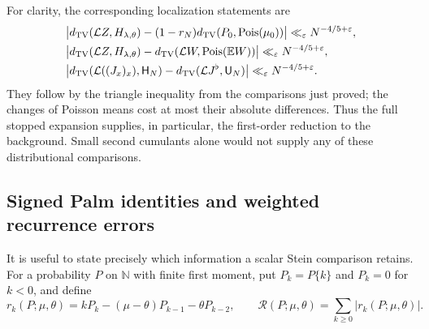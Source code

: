 For clarity, the corresponding localization statements are
\begin{align}
 &\big|d_{\mathrm{TV}}(\mathcal L Z,H_{\lambda,\theta})
       -(1-r_N)d_{\mathrm{TV}}(P_0,\operatorname{Pois}(\mu_0))\big|
       \ll_\varepsilon N^{-4/5+\varepsilon},
       \label{p1:limits:background-localization}\\
 &\big|d_{\mathrm{TV}}(\mathcal L Z,H_{\lambda,\theta})
       -d_{\mathrm{TV}}(\mathcal L W,\operatorname{Pois}(\mathbb E W))\big|
       \ll_\varepsilon N^{-4/5+\varepsilon},
       \label{p1:limits:erased-localization}\\
 &\big|d_{\mathrm{TV}}(\mathcal L((J_x)_x),\mathsf H_N)
       -d_{\mathrm{TV}}(\mathcal L J^\flat,\mathsf U_N)\big|
       \ll_\varepsilon N^{-4/5+\varepsilon}.
       \label{p1:limits:spatial-localization}
\end{align}
They follow by the triangle inequality from the comparisons just
proved; the changes of Poisson means cost at most their absolute
differences.  Thus the full stopped expansion supplies, in
particular, the first-order reduction to the background.
Small second cumulants alone would not supply any of these
distributional comparisons.

\subsection{Signed Palm identities and weighted recurrence errors}

It is useful to state precisely which information a scalar
Stein comparison retains.  For a probability $P$ on
$\mathbb N$ with finite first moment, put $P_k=P\{k\}$ and
$P_k=0$ for $k<0$, and define
\begin{equation}
 r_k(P;\mu,\theta)
       =kP_k-(\mu-\theta)P_{k-1}-\theta P_{k-2},\qquad
 \mathcal R(P;\mu,\theta)=\sum_{k\ge0}|r_k(P;\mu,\theta)|.
 \label{p1:limits:raw-residual}
\end{equation}

